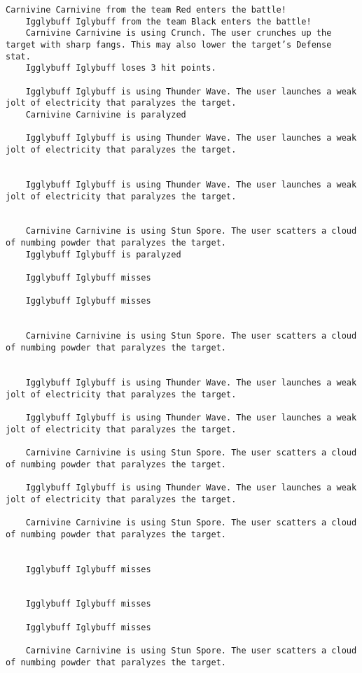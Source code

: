     \begin{lstlisting}[caption={Результат выполнения программы},label={lst:result}]
    Carnivine Carnivine from the team Red enters the battle!
    Igglybuff Iglybuff from the team Black enters the battle!
    Carnivine Carnivine is using Crunch. The user crunches up the target with sharp fangs. This may also lower the target’s Defense stat.
    Igglybuff Iglybuff loses 3 hit points.

    Igglybuff Iglybuff is using Thunder Wave. The user launches a weak jolt of electricity that paralyzes the target.
    Carnivine Carnivine is paralyzed

    Igglybuff Iglybuff is using Thunder Wave. The user launches a weak jolt of electricity that paralyzes the target.


    Igglybuff Iglybuff is using Thunder Wave. The user launches a weak jolt of electricity that paralyzes the target.


    Carnivine Carnivine is using Stun Spore. The user scatters a cloud of numbing powder that paralyzes the target.
    Igglybuff Iglybuff is paralyzed

    Igglybuff Iglybuff misses

    Igglybuff Iglybuff misses


    Carnivine Carnivine is using Stun Spore. The user scatters a cloud of numbing powder that paralyzes the target.


    Igglybuff Iglybuff is using Thunder Wave. The user launches a weak jolt of electricity that paralyzes the target.

    Igglybuff Iglybuff is using Thunder Wave. The user launches a weak jolt of electricity that paralyzes the target.

    Carnivine Carnivine is using Stun Spore. The user scatters a cloud of numbing powder that paralyzes the target.

    Igglybuff Iglybuff is using Thunder Wave. The user launches a weak jolt of electricity that paralyzes the target.

    Carnivine Carnivine is using Stun Spore. The user scatters a cloud of numbing powder that paralyzes the target.


    Igglybuff Iglybuff misses


    Igglybuff Iglybuff misses

    Igglybuff Iglybuff misses

    Carnivine Carnivine is using Stun Spore. The user scatters a cloud of numbing powder that paralyzes the target.


\end{lstlisting}
